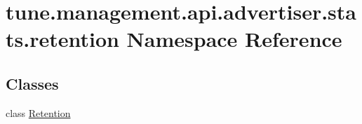 \hypertarget{namespacetune_1_1management_1_1api_1_1advertiser_1_1stats_1_1retention}{\section{tune.\-management.\-api.\-advertiser.\-stats.\-retention Namespace Reference}
\label{namespacetune_1_1management_1_1api_1_1advertiser_1_1stats_1_1retention}
}
\subsection*{Classes}
\begin{DoxyCompactItemize}
\item 
class \hyperlink{classtune_1_1management_1_1api_1_1advertiser_1_1stats_1_1retention_1_1Retention}{Retention}
\end{DoxyCompactItemize}
